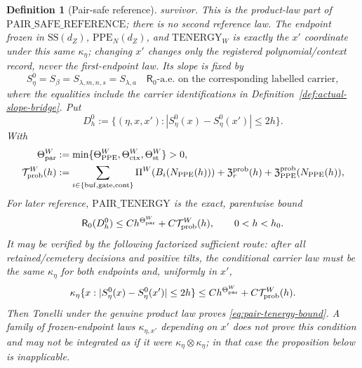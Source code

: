 \documentclass[11pt]{article}
\newtheorem{definition}[theorem]{Definition}
\begin{document}
\begin{definition}[Pair-safe reference]
survivor.  This is the product-law part of
$\mathrm{PAIR\_SAFE\_REFERENCE}$; there is no
second reference law.  The endpoint frozen in $\mathrm{SS}(d_Z)$,
$\mathrm{PPE}_{N}(d_Z)$, and $\mathrm{TENERGY}_{W}$ is exactly the
$x'$ coordinate under this same $\kappa_\eta$; changing $x'$ changes only
the registered polynomial/context record, never the first-endpoint law.
Its slope is fixed by
\begin{equation}
\label{eq:reference-slope-identification}
 S_\eta^0=S_\beta=S_{\lambda,m,n,s}=S_{\lambda,a}
 \quad \mathsf R_0\text{-a.e. on the corresponding labelled carrier},
\end{equation}
where the equalities include the carrier identifications in
Definition~\ref{def:actual-slope-bridge}.  Put
\begin{equation}
\label{eq:exact-reference-pair-event}
 D_h^0:=\{(\eta,x,x'):
     |S_\eta^0(x)-S_\eta^0(x')|\le2h\}.
\end{equation}
With
\begin{align}
 \Theta_{\rm par}^{W}&:=\min\{\Theta_{\rm PPE}^{W},
        \Theta_{\rm ctx}^{W},\Theta_{\rm st}^{W}\}>0,
 \label{eq:physical-energy-exponent}\\
 \mathcal T_{\rm prob}^{W}(h)&:=
 \sum_{i\in\{\rm buf,gate,cont\}}\Pi^W(B_i(N_{\rm PPE}(h)))
 +\mathfrak Z_r^{\rm prob}(h)
 +\mathfrak Z_{\rm PPE}^{\rm prob}(N_{\rm PPE}(h)),
 \label{eq:complete-energy-tail}
\end{align}
For later reference, $\mathrm{PAIR\_TENERGY}$ is the exact, parentwise bound
\begin{equation}
\label{eq:pair-tenergy-bound}
 \mathsf R_0(D_h^0)
 \le Ch^{\Theta_{\rm par}^{W}}+C\mathcal T_{\rm prob}^{W}(h),
 \qquad 0<h<h_0.
\end{equation}
It may be verified by the following factorized sufficient route: after all
retained/cemetery decisions and positive tilts, the conditional carrier law
must be the same $\kappa_\eta$ for both endpoints and, uniformly in
$x'$,
\begin{equation}
\label{eq:pair-tenergy-factorized-route}
 \kappa_\eta\{x:
 |S_\eta^0(x)-S_\eta^0(x')|\le2h\}
 \le Ch^{\Theta_{\rm par}^{W}}+C\mathcal T_{\rm prob}^{W}(h).
\end{equation}
Then Tonelli under the genuine product law proves
\eqref{eq:pair-tenergy-bound}.  A family of frozen-endpoint laws
$\kappa_{\eta,x'}$ depending on $x'$ does not prove this condition and may
not be integrated as if it were
$\kappa_\eta\otimes\kappa_\eta$; in that case the proposition below is
inapplicable.
\end{definition}
\end{document}
